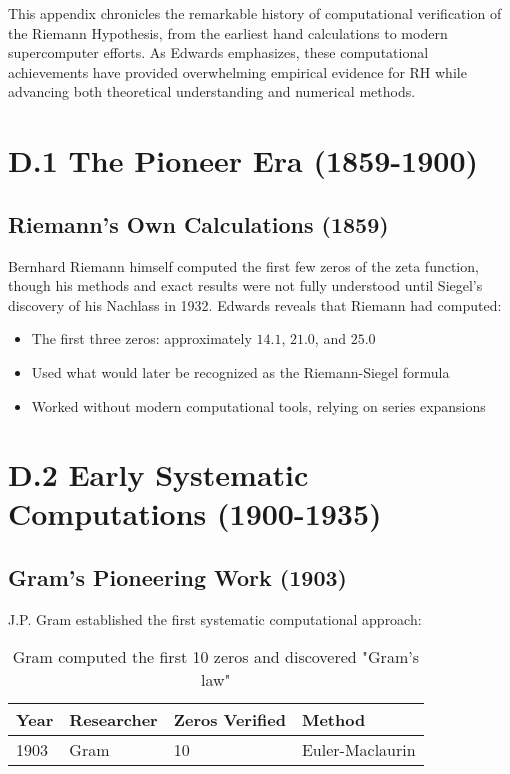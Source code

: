 
This appendix chronicles the remarkable history of computational verification of the Riemann Hypothesis, from the earliest hand calculations to modern supercomputer efforts. As Edwards \cite{edwards1974} emphasizes, these computational achievements have provided overwhelming empirical evidence for RH while advancing both theoretical understanding and numerical methods.

\section{D.1 The Pioneer Era (1859-1900)}

\subsection{Riemann's Own Calculations (1859)}

Bernhard Riemann himself computed the first few zeros of the zeta function, though his methods and exact results were not fully understood until Siegel's discovery of his Nachlass in 1932. Edwards \cite{edwards1974} reveals that Riemann had computed:
\begin{itemize}
\item The first three zeros: approximately $14.1$, $21.0$, and $25.0$
\item Used what would later be recognized as the Riemann-Siegel formula
\item Worked without modern computational tools, relying on series expansions
\end{itemize}

\section{D.2 Early Systematic Computations (1900-1935)}

\subsection{Gram's Pioneering Work (1903)}

J.P. Gram established the first systematic computational approach:

\begin{table}[h]
\centering
\begin{tabular}{|l|l|l|l|}
\hline
\textbf{Year} & \textbf{Researcher} & \textbf{Zeros Verified} & \textbf{Method} \\
\hline
1903 & Gram & 10 & Euler-Maclaurin \\
\hline
\end{tabular}
\caption{Gram computed the first 10 zeros and discovered "Gram's law"}
\end{table}

